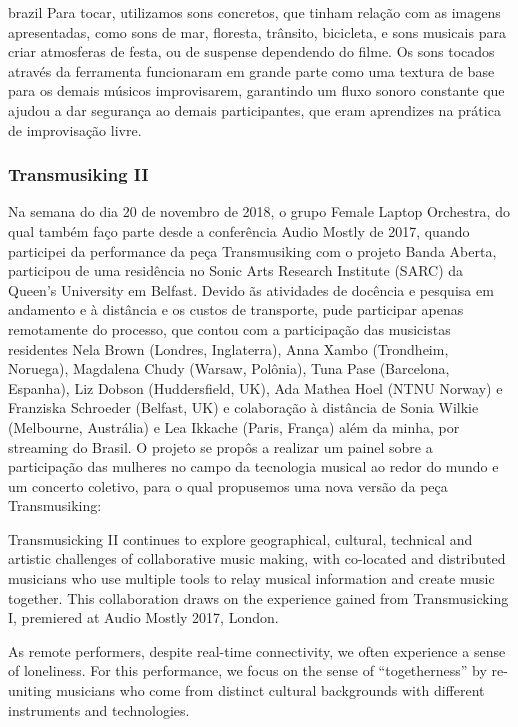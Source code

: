 \begin{otherlanguage*}{brazil}
Para tocar, utilizamos sons concretos, que tinham relação com as imagens apresentadas, como sons de mar, floresta, trânsito, bicicleta, e sons musicais para criar atmosferas de festa, ou de suspense dependendo do filme. Os sons tocados através da ferramenta funcionaram em grande parte como uma textura de base para os demais músicos improvisarem, garantindo um fluxo sonoro constante que ajudou a dar segurança ao demais participantes, que eram aprendizes na prática de improvisação livre.




\subsubsection{Transmusiking II}

Na semana do dia 20 de novembro de 2018, o grupo Female Laptop Orchestra, do qual também faço parte desde a conferência Audio Mostly de 2017, quando participei da performance da peça Transmusiking com o projeto Banda Aberta, participou de uma residência no Sonic Arts Research Institute (SARC) da Queen's University em Belfast. Devido ãs atividades de docência e pesquisa em andamento e à distância e os custos de transporte, pude participar apenas remotamente do processo, que contou com a participação das musicistas residentes Nela Brown (Londres, Inglaterra), Anna Xambo (Trondheim, Noruega), Magdalena Chudy (Warsaw, Polônia), Tuna Pase (Barcelona, Espanha), Liz Dobson (Huddersfield, UK), Ada Mathea Hoel (NTNU Norway) e Franziska Schroeder (Belfast, UK) e colaboração à distância de Sonia Wilkie (Melbourne, Austrália) e Lea Ikkache (Paris, França) além da minha, por streaming do Brasil. O projeto se propôs a realizar um painel sobre a participação das mulheres no campo da tecnologia musical ao redor do mundo e um concerto coletivo, para o qual propusemos uma nova versão da peça Transmusiking:


\begin{citacao}
Transmusicking II continues to explore geographical, cultural, technical and artistic challenges of collaborative music making, with co-located and distributed musicians who use multiple tools to relay musical information and create music together. This collaboration draws on the experience gained from Transmusicking I, premiered at Audio Mostly 2017, London.

As remote performers, despite real-time connectivity, we often experience a sense of loneliness. For this performance, we focus on the sense of “togetherness” by re-uniting musicians who come from distinct cultural backgrounds with different instruments and technologies. 


\end{citacao}
\end{otherlanguage*}
